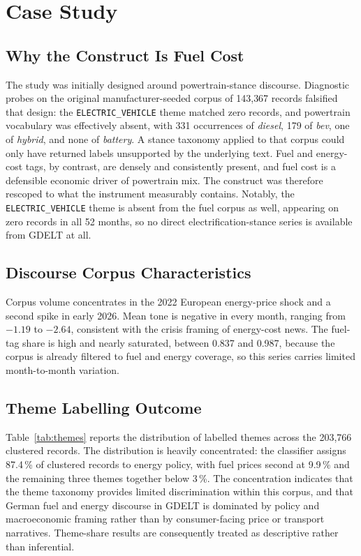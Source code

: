 \documentclass[conference]{IEEEtran}
\begin{document}
\section{Case Study}
\subsection{Why the Construct Is Fuel Cost}
The study was initially designed around powertrain-stance discourse. Diagnostic
probes on the original manufacturer-seeded corpus of 143{,}367 records falsified
that design: the \texttt{ELECTRIC\_VEHICLE} theme matched zero records, and
powertrain vocabulary was effectively absent, with 331 occurrences of
\emph{diesel}, 179 of \emph{bev}, one of \emph{hybrid}, and none of
\emph{battery}. A stance taxonomy applied to that corpus could only have
returned labels unsupported by the underlying text. Fuel and energy-cost tags,
by contrast, are densely and consistently present, and fuel cost is a defensible
economic driver of powertrain mix. The construct was therefore rescoped to what
the instrument measurably contains. Notably, the \texttt{ELECTRIC\_VEHICLE}
theme is absent from the fuel corpus as well, appearing on zero records in all
52 months, so no direct electrification-stance series is available from GDELT at
all.

\subsection{Discourse Corpus Characteristics}
Corpus volume concentrates in the 2022 European energy-price shock and a second
spike in early 2026. Mean tone is negative in every month, ranging from $-1.19$
to $-2.64$, consistent with the crisis framing of energy-cost news. The
fuel-tag share is high and nearly saturated, between 0.837 and 0.987, because
the corpus is already filtered to fuel and energy coverage, so this series
carries limited month-to-month variation.

\subsection{Theme Labelling Outcome}
Table~\ref{tab:themes} reports the distribution of labelled themes across the
203{,}766 clustered records. The distribution is heavily concentrated: the
classifier assigns 87.4\,\% of clustered records to energy policy, with fuel
prices second at 9.9\,\% and the remaining three themes together below 3\,\%.
The concentration indicates that the theme taxonomy provides limited
discrimination within this corpus, and that German fuel and energy discourse in
GDELT is dominated by policy and macroeconomic framing rather than by
consumer-facing price or transport narratives. Theme-share results are
consequently treated as descriptive rather than inferential.
\end{document}
